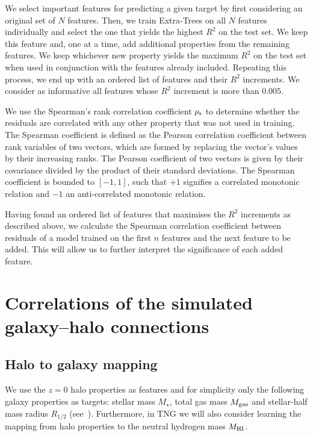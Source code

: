 \documentclass[usenatbib,useAMS]{mnras}
\begin{document}
We select important features for predicting a given target by first considering an original set of $N$ features. Then, we train Extra-Trees on all $N$ features individually and select the one that yields the highest $R^2$ on the test set. We keep this feature and, one at a time, add additional properties from the remaining features. We keep whichever new property yields the maximum $R^2$ on the test set when used in conjunction with the features already included. Repeating this process, we end up with an ordered list of features and their $R^2$ increments. We consider as informative all features whose $R^2$ increment is more than $0.005$.

We use the Spearman's rank correlation coefficient $\rho_{\rm s}$ to determine whether the residuals are correlated with any other property that was not used in training. The Spearman coefficient is defined as the Pearson correlation coefficient between rank variables of two vectors, which are formed by replacing the vector's values by their increasing ranks. The Pearson coefficient of two vectors is given by their covariance divided by the product of their standard deviations. The Spearman coefficient is bounded to $\left[-1, 1\right]$, such that $+1$ signifies a correlated monotonic relation and $-1$ an anti-correlated monotonic relation.

Having found an ordered list of features that maximises the $R^2$ increments as described above, we calculate the Spearman correlation coefficient between residuals of a model trained on the first $n$ features and the next feature to be added. This will allow us to further interpret the significance of each added feature.


\section{Correlations of the simulated galaxy--halo connections}
\label{sec:Results}

\subsection{Halo to galaxy mapping}
\label{sec:halo_to_galaxy}

We use the $z=0$ halo properties as features and for simplicity only the following galaxy properties as targets: stellar mass $M_\star$, total gas mass $M_{\rm gas}$ and stellar-half mass radius $R_{1/2}$ (see~). Furthermore, in TNG we will also consider learning the mapping from halo properties to the neutral hydrogen mass $M_{\rm HI}$.
\end{document}
